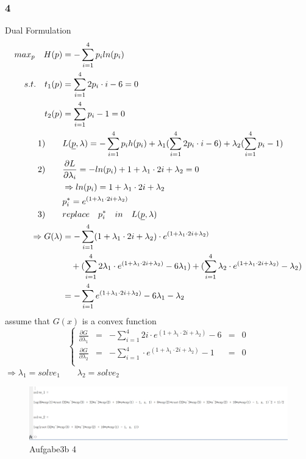 \documentclass{article}
\begin{document}
\subsubsection*{4}
Dual Formulation\\
\begin{equation}\notag
\begin{aligned}
max_p \quad H(p)&=-\sum\limits_{i=1}^{4}p_i ln(p_i)\\
s.t. \quad t_1(p) &= \sum\limits_{i=1}^{4}2p_i \cdot i -6 = 0\\
t_2(p)&=\sum\limits_{i=1}^{4}p_i-1=0\\
1)\qquad &L(\uline{p},\lambda) = -\sum\limits_{i=1}^{4}p_i h(p_i) + \lambda_1(\sum\limits_{i=1}^{4}2p_i \cdot i -6)+ \lambda_2(\sum\limits_{i=1}^{4}p_i-1)\\
2)\qquad &\frac{\partial L}{\partial \lambda_i} = -ln(p_i)+1+\lambda_1 \cdot 2i + \lambda_2 =0\\
 &\Rightarrow ln(p_i)= 1+\lambda_1 \cdot 2i + \lambda_2\\
&p^{*}_{i}= e^{(1+\lambda_1 \cdot 2i + \lambda_2)}\\
3) \qquad  &replace \quad p^{*}_{i}  \quad  in  \quad L(\uline{p},\lambda)\\
\Rightarrow G(\lambda) &=  -\sum\limits_{i=1}^{4} (1+\lambda_1 \cdot 2i + \lambda_2)\cdot e^{(1+\lambda_1 \cdot 2i + \lambda_2)}\\
&\quad + (\sum\limits_{i=1}^{4}2\lambda_1\cdot e^{(1+\lambda_1 \cdot 2i + \lambda_2)}-6\lambda_1)+(\sum\limits_{i=1}^{4}\lambda_2\cdot e^{(1+\lambda_1 \cdot 2i + \lambda_2)}-\lambda_2)\\
&= -\sum\limits_{i=1}^{4}  e^{(1+\lambda_1 \cdot 2i + \lambda_2)}-6\lambda_1-\lambda_2
\end{aligned}
\end{equation}
assume that $G(x)$ is a convex function\\
$$ 
\left\{
\begin{aligned}
\frac{\partial G}{\partial \lambda_1} & = & -\sum\limits_{i=1}^{4} 2i\cdot e^{(1+\lambda_1 \cdot 2i + \lambda_2)}-6&=&0 \\
\frac{\partial G}{\partial \lambda_2} & = & -\sum\limits_{i=1}^{4}\cdot e^{(1+\lambda_1 \cdot 2i + \lambda_2)}-1&=&0 \\
\end{aligned}
\right.
$$
$
\Rightarrow \lambda_1=solve_1 \qquad \lambda_2=solve_2
$
\\
\begin{figure}[H] 
\centering 
\includegraphics[width=1\textwidth]{Aufgabe3 4b.png} 
\caption{Aufgabe3b 4} 
\label{Fig.main4}
\end{figure}
\end{document}
